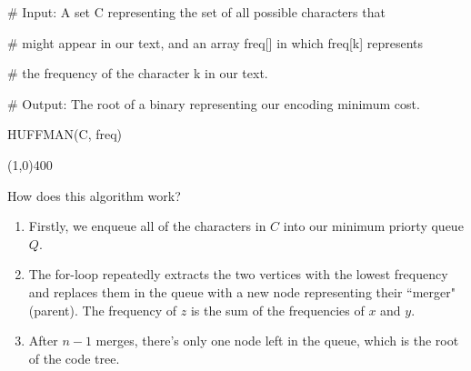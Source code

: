 \begin{allintypewriter}
\# Input: A set C representing the set of all possible characters that 

\# might appear in our text, and an array freq[] in which freq[k] represents 

\# the frequency of the character k in our text.

\# Output: The root of a binary representing our encoding minimum cost.

\hspace{0cm}

HUFFMAN(C, freq) 

\begin{center}
\line(1,0){400}
\end{center}
\end{allintypewriter}

How does this algorithm work?

\begin{enumerate}
    \item Firstly, we enqueue all of the characters in $C$ into our minimum priorty queue $Q$.
    \item The for-loop repeatedly extracts the two vertices with the lowest frequency and replaces them in the queue with a new node representing their ``merger" (parent). The frequency of $z$ is the sum of the frequencies of $x$ and $y$.
    \item After $n - 1$ merges, there's only one node left in the queue, which is the root of the code tree.
\end{enumerate}

